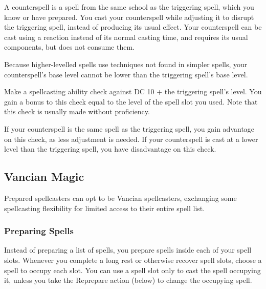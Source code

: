 \documentclass[letterpaper,twocolumn,openany,nodeprecatedcode]{dndbook}
\begin{document}
A counterspell is a spell from the same school as the triggering spell, which you know or have prepared. You cast your counterspell while adjusting it to disrupt the triggering spell, instead of producing its usual effect. Your counterspell can be cast using a reaction instead of its normal casting time, and requires its usual components, but does not consume them.

Because higher-levelled spells use techniques not found in simpler spells, your counterspell's base level cannot be lower than the triggering spell's base level. 

Make a spellcasting ability check against DC 10 + the triggering spell's level. You gain a bonus to this check equal to the level of the spell slot you used. Note that this check is usually made without proficiency.

If your counterspell is the same spell as the triggering spell, you gain advantage on this check, as less adjustment is needed. If your counterspell is cast at a lower level than the triggering spell, you have disadvantage on this check.

\subsection{Vancian Magic}
Prepared spellcasters can opt to be Vancian spellcasters, exchanging some spellcasting flexibility for limited access to their entire spell list.

\subsubsection{Preparing Spells}
Instead of preparing a list of spells, you prepare spells inside each of your spell slots. Whenever you complete a long rest or otherwise recover spell slots, choose a spell to occupy each slot. You can use a spell slot only to cast the spell occupying it, unless you take the Reprepare action (below) to change the occupying spell.
\end{document}
